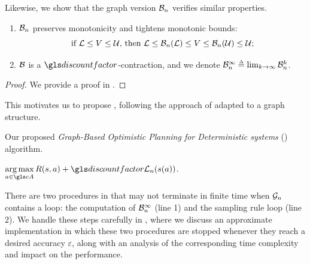  Likewise, we show that the graph version $\cB_n$ verifies similar properties.
\begin{lemma}[Properties of $\cB_n$]
	\begin{leftbar}[lemmabar]
	\label{lem:properties-b-graph}
	\leavevmode\newline
	\begin{enumerate}[label=(\roman*)]
		\item $\cB_n$ preserves monotonicity and tightens monotonic bounds: $$
		\text{if } \mathcal{L}\leq V\leq \mathcal{U} \text{, then } \mathcal{L} \leq \mathcal{B}_n(\mathcal{L}) \leq V \leq \mathcal{B}_n(\mathcal{U}) \leq \mathcal{U};
		$$
		\item $\mathcal{B}$ is a $\discount$-contraction, and we denote $\cB_n^{\infty} \eqdef \lim_{k\rightarrow \infty} \cB_n^k$.
	\end{enumerate}
	\end{leftbar}
\end{lemma}
\begin{proof}
	We provide a proof in .
\end{proof}
This motivates us to propose , following the approach of  adapted to a graph structure.

\begin{algorithm}[!ht]
	\caption{Our proposed \emph{Graph-Based Optimistic Planning for Deterministic systems} (\GBOPD) algorithm.}
	\label{alg:gbop-d}
	\DontPrintSemicolon
	\Return $\displaystyle\argmax_{a\in \cA} R(s,a) + \discount \cL_n(s(a))$. 
\end{algorithm}

\begin{remark}
	\begin{leftbar}[remarkbar]
	There are two procedures in \GBOPD that may not terminate in finite time when $\mathcal{G}_n$ contains a loop:
		the computation of $\mathcal{B}_n^\infty$ (line 1) and
		the sampling rule loop (line 2).
	We handle these steps carefully in , where we discuss an approximate implementation in which these two procedures are stopped whenever they reach a desired accuracy $\varepsilon$, along with an analysis of the corresponding time complexity and impact on the performance.
	\end{leftbar}
\end{remark}

